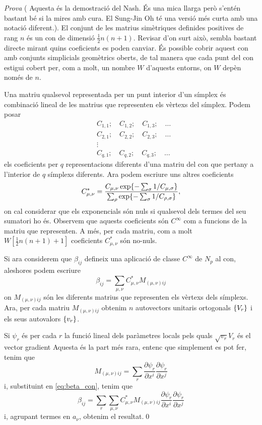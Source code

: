 {\color{green!50!black}\textit{Prova} ({\color{blue} Aquesta és la demostració del Nash. És una mica llarga però s'entén bastant bé si la mires amb cura. El Sung-Jin Oh té una versió més curta amb una notació diferent.}).
El conjunt de les matrius simètriques definides positives de rang $n$ és un con de dimensió $\frac12n(n+1)$.{\color{blue} Revisar d'on surt això, sembla bastant directe mirant quins coeficients es poden canviar.} És possible cobrir aquest con amb conjunts simplicials geomètrics oberts, de tal manera que cada punt del con estigui cobert per, com a molt, un nombre $W$ d'aquests entorns, on $W$ depèn només de $n$. 

Una matriu qualsevol representada per un punt interior d'un símplex és combinació lineal de les matrius que representen els vèrtexs del símplex. Podem posar
$$\begin{aligned}
    &C_{1,1}; \quad C_{1,2}; \quad C_{1,3}; \quad \dots\\
    &C_{2,1}; \quad C_{2,2}; \quad C_{2,3}; \quad \dots\\
    &\vdots\\
    &C_{q,1}; \quad C_{q,2}; \quad C_{q,3}; \quad \dots
\end{aligned}$$
els coeficients per $q$ representacions diferents d'una matriu del con que pertany a l'interior de $q$ símplexs diferents. 
Ara podem escriure uns altres coeficients
$$ C_{\mu,\nu}^* = \frac{C_{\mu,\nu} \exp\{-\sum_\sigma 1/C_{\mu,\sigma}\}}{\sum_{\rho}\exp\{-\sum_\sigma 1/C_{\rho,\sigma}\}}, $$ on cal considerar que els exponencials són nuls si qualsevol dels termes del seu sumatori ho és. 
Observem que aquests coeficients són $C^\infty$ com a funcions de la matriu que representen. A més, per cada matriu, com a molt $W[\frac12n(n+1)+1]$ coeficients $C_{\mu,\nu}^*$ són no-nuls.

Si ara considerem que $\beta_{ij}$ defineix una aplicació de classe $C^\infty$ de $N_p$ al con, aleshores podem escriure 
\begin{equation}\label{eq:beta_con}
    \beta_{ij} = \sum_{\mu,\nu}C_{\mu,\nu}^*M_{(\mu,\nu)ij}
\end{equation}
on $M_{(\mu,\nu)ij}$ són les diferents matrius que representen els vèrtexs dels símplexs. Ara, per cada matriu $M_{(\mu,\nu)ij}$ obtenim $n$ autovectors unitaris ortogonals $\{V_r\}$ i els seus autovalors $\{v_r\}$.

Si $\psi_r$ és per cada $r$ la funció lineal dels paràmetres locals pels quals $\sqrt{v_r}V_r$ és el vector gradient {\color{blue}Aquesta és la part més rara, entenc que simplement es pot fer}, tenim que
\begin{equation}
    M_{(\mu,\nu)ij} = \sum_{r}\frac{\partial\psi_r}{\partial x^i}\frac{\partial\psi_r}{\partial x^j}
\end{equation}
i, substituint en \ref{eq:beta_con}, tenim que
\begin{equation}
    \beta_{ij} = \sum_{r}\sum_{\mu,\nu}C_{\mu,\nu}^*M_{(\mu,\nu)ij}\frac{\partial\psi_r}{\partial x^i}\frac{\partial\psi_r}{\partial x^j}
\end{equation}
i, agrupant termes en $a_\nu$, obtenim el resultat.\qed
}

